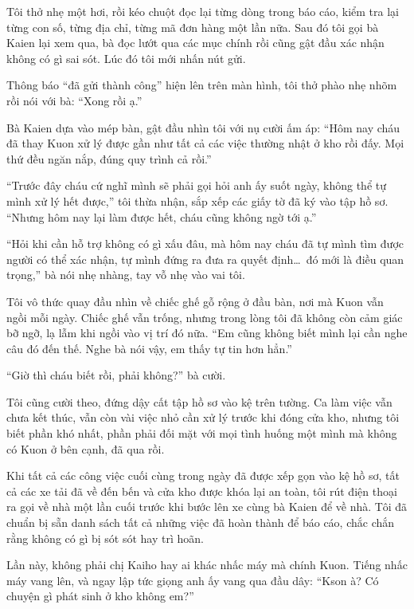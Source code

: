 \documentclass[../main.tex]{subfiles}
\begin{document}
Tôi thở nhẹ một hơi, rồi kéo chuột đọc lại từng dòng trong báo cáo, kiểm tra lại từng con số, từng địa chỉ, từng mã đơn hàng một lần nữa. Sau đó tôi gọi bà Kaien lại xem qua, bà đọc lướt qua các mục chính rồi cũng gật đầu xác nhận không có gì sai sót. Lúc đó tôi mới nhấn nút gửi.

Thông báo ``đã gửi thành công'' hiện lên trên màn hình, tôi thở phào nhẹ nhõm rồi nói với bà: ``Xong rồi ạ.''

Bà Kaien dựa vào mép bàn, gật đầu nhìn tôi với nụ cười ấm áp: ``Hôm nay cháu đã thay Kuon xử lý được gần như tất cả các việc thường nhật ở kho rồi đấy. Mọi thứ đều ngăn nắp, đúng quy trình cả rồi.''

``Trước đây cháu cứ nghĩ mình sẽ phải gọi hỏi anh ấy suốt ngày, không thể tự mình xử lý hết được,'' tôi thừa nhận, sắp xếp các giấy tờ đã ký vào tập hồ sơ. ``Nhưng hôm nay lại làm được hết, cháu cũng không ngờ tới ạ.''

``Hỏi khi cần hỗ trợ không có gì xấu đâu, mà hôm nay cháu đã tự mình tìm được người có thể xác nhận, tự mình đứng ra đưa ra quyết định\dots\ đó mới là điều quan trọng,'' bà nói nhẹ nhàng, tay vỗ nhẹ vào vai tôi.

Tôi vô thức quay đầu nhìn về chiếc ghế gỗ rộng ở đầu bàn, nơi mà Kuon vẫn ngồi mỗi ngày. Chiếc ghế vẫn trống, nhưng trong lòng tôi đã không còn cảm giác bỡ ngỡ, lạ lẫm khi ngồi vào vị trí đó nữa. ``Em cũng không biết mình lại cần nghe câu đó đến thế. Nghe bà nói vậy, em thấy tự tin hơn hẳn.''

``Giờ thì cháu biết rồi, phải không?'' bà cười.

Tôi cũng cười theo, đứng dậy cất tập hồ sơ vào kệ trên tường. Ca làm việc vẫn chưa kết thúc, vẫn còn vài việc nhỏ cần xử lý trước khi đóng cửa kho, nhưng tôi biết phần khó nhất, phần phải đối mặt với mọi tình huống một mình mà không có Kuon ở bên cạnh, đã qua rồi.

\ct

Khi tất cả các công việc cuối cùng trong ngày đã được xếp gọn vào kệ hồ sơ, tất cả các xe tải đã về đến bến và cửa kho được khóa lại an toàn, tôi rút điện thoại ra gọi về nhà một lần cuối trước khi bước lên xe cùng bà Kaien để về nhà. Tôi đã chuẩn bị sẵn danh sách tất cả những việc đã hoàn thành để báo cáo, chắc chắn rằng không có gì bị sót sót hay trì hoãn.

Lần này, không phải chị Kaiho hay ai khác nhấc máy mà chính Kuon. Tiếng nhấc máy vang lên, và ngay lập tức giọng anh ấy vang qua đầu dây: ``Kson à? Có chuyện gì phát sinh ở kho không em?''
\end{document}
